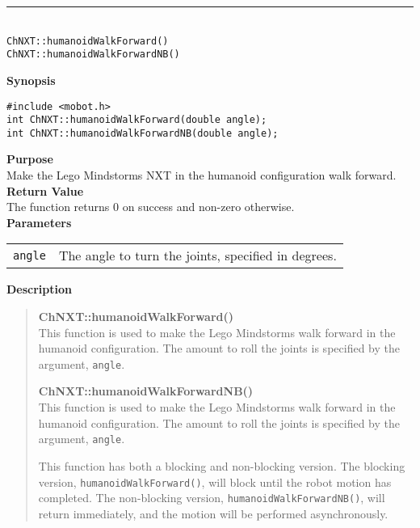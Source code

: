 \noindent
\vspace{5pt}
\rule{4.5in}{0.015in}\\
\noindent
{\LARGE \texttt{ChNXT::humanoidWalkForward()}}\\
{\LARGE \texttt{ChNXT::humanoidWalkForwardNB()}}\\
{}

\noindent
{\bf Synopsis}
\vspace{-8pt}
\begin{verbatim}
#include <mobot.h>
int ChNXT::humanoidWalkForward(double angle);
int ChNXT::humanoidWalkForwardNB(double angle);
\end{verbatim}

\noindent
{\bf Purpose}\\
Make the Lego Mindstorms NXT in the humanoid configuration walk forward.\\

\noindent
{\bf Return Value}\\
The function returns 0 on success and non-zero otherwise.\\

\noindent
{\bf Parameters}\\
\vspace{-0.1in}
\begin{description}
\item               
\begin{tabular}{p{15 mm}p{145 mm}}
\texttt{angle} & The angle to turn the joints, specified in degrees.\\
\end{tabular}
\end{description}

\noindent
{\bf Description}\\
\vspace{-12pt}
\begin{quote}
{\bf ChNXT::humanoidWalkForward()}\\
This function is used to make the Lego Mindstorms walk forward in the humanoid
configuration. The amount to roll the joints is specified by the argument,
\texttt{angle}.

{\bf ChNXT::humanoidWalkForwardNB()}\\
This function is used to make the Lego Mindstorms walk forward in the humanoid
configuration. The amount to roll the joints is specified by the argument,
\texttt{angle}.

This function has both a blocking and non-blocking version.
The blocking version, \texttt{humanoidWalkForward()}, will block until the
robot motion has completed. The non-blocking version, \texttt{humanoidWalkForwardNB()},
will return immediately, and the motion will be performed asynchronously.\\
\end{quote}

